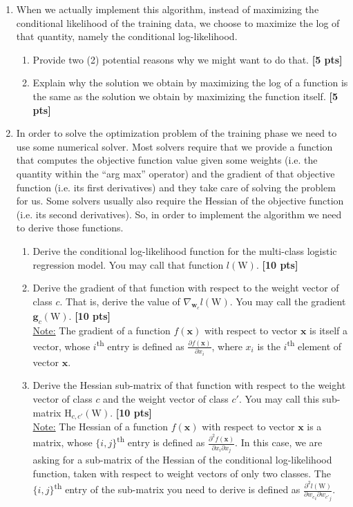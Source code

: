 \begin{enumerate}
	\item When we actually implement this algorithm, instead of maximizing the conditional likelihood of the training data, we choose to maximize the log of that quantity, namely the conditional log-likelihood.
	\begin{enumerate}
		\item Provide two (2) potential reasons why we might want to do that.
		{\bf [5 pts]}
		\item Explain why the solution we obtain by maximizing the log of a function is the same as the solution we obtain by maximizing the function itself.
		{\bf [5 pts]}
	\end{enumerate}
	
	\item In order to solve the optimization problem of the training phase we need to use some numerical solver. Most solvers require that we provide a function that computes the objective function value given some weights (i.e. the quantity within the ``arg max'' operator) and the gradient of that objective function (i.e. its first derivatives) and they take care of solving the problem for us. Some solvers usually also require the Hessian of the objective function (i.e. its second derivatives). So, in order to implement the algorithm we need to derive those functions.
	\begin{enumerate}
		\item Derive the conditional log-likelihood function for the multi-class logistic regression model. You may call that function $l(\text{W})$.
		{\bf [10 pts]}
		\item Derive the gradient of that function with respect to the weight vector of class $c$. That is, derive the value of $\nabla_{\boldsymbol{w}_c}l(\text{W})$. You may call the gradient $\boldsymbol{g}_c(\text{W})$.
		{\bf [10 pts]}\\
		{\small \underline{Note:} The gradient of a function $f(\boldsymbol{x})$ with respect to vector $\boldsymbol{x}$ is itself a vector, whose $i$\textsuperscript{th} entry is defined as $\frac{\partial f(\boldsymbol{x})}{\partial x_i}$, where $x_i$ is the $i$\textsuperscript{th} element of vector $\boldsymbol{x}$.}
		\item Derive the Hessian sub-matrix of that function with respect to the weight vector of class $c$ and the weight vector of class $c'$. You may call this sub-matrix $\text{H}_{c,c'}(\text{W})$.
		{\bf [10 pts]}\\
		{\small \underline{Note:} The Hessian of a function $f(\boldsymbol{x})$ with respect to vector $\boldsymbol{x}$ is a matrix, whose $\{i,j\}$\textsuperscript{th} entry is defined as $\frac{\partial^2 f(\boldsymbol{x})}{\partial x_i\partial x_j}$. In this case, we are asking for a sub-matrix of the Hessian of the conditional log-likelihood function, taken with respect to weight vectors of only two classes. The $\{i,j\}$\textsuperscript{th} entry of the sub-matrix you need to derive is defined as $\frac{\partial^2 l(\text{W})}{\partial {w_c}_i\partial {w_{c'}}_j}$.} \\\\
	\end{enumerate}
\end{enumerate}